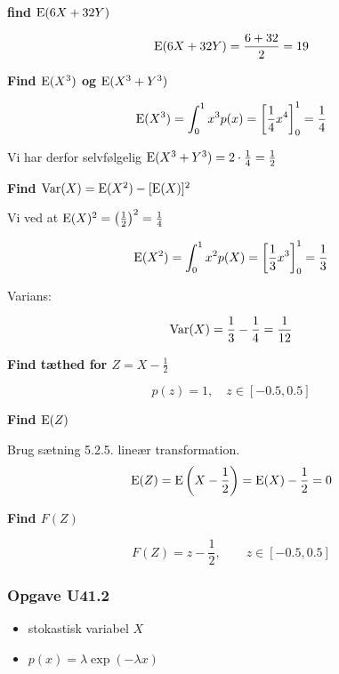 \textbf{find $\text{E}(6X + 32Y)$}

\begin{equation}
    \text{E}(6X + 32Y) = \frac{6 + 32}{2} = 19
\end{equation}

\textbf{Find $\text{E}(X^3)$ og $\text{E}(X^3 + Y^3)$}

\begin{equation}
    \text{E}(X^3) = \int_0^1 x^3 p(x) = \left[ \frac{1}{4} x^4\right]_0^1 = \frac{1}{4}
\end{equation}

Vi har derfor selvfølgelig $\text{E}(X^3 + Y^3) = 2 \cdot \frac{1}{4} = \frac{1}{2}$

\textbf{Find $\text{Var}(X) = \text{E}(X^2) - [\text{E}(X)]^2$}

Vi ved at $\text{E}(X)^2 = \left(\frac{1}{2}\right)^2 = \frac{1}{4}$

\begin{equation}
    \text{E}(X^2) = \int_{0}^{1} x^2 p(X) = \left[ \frac{1}{3} x^3\right]_0^1 = \frac{1}{3} 
\end{equation}

Varians:

\begin{equation}
    \text{Var}(X) = \frac{1}{3} - \frac{1}{4} = \frac{1}{12}
\end{equation}

\textbf{Find tæthed for $Z = X - \frac{1}{2}$}

\begin{equation}
    p(z) = 1, \quad z \in[-0.5 , 0.5]
\end{equation}

\textbf{Find $\text{E}(Z)$}

Brug sætning 5.2.5. lineær transformation.
\begin{equation}
    \text{E}(Z) = \text{E}\left( X - \frac{1}{2}\right) =   \text{E}(X) - \frac{1}{2} = 0
\end{equation}

\textbf{Find $F(Z)$}

\begin{equation}
    F(Z) = z - \frac{1}{2}, \qquad z\in[-0.5 , 0.5]
\end{equation}

\subsubsection{Opgave U41.2}

\begin{itemize}
    \item stokastisk variabel $X$
    \item $p(x) = \lambda \exp (-\lambda x)$
\end{itemize}

